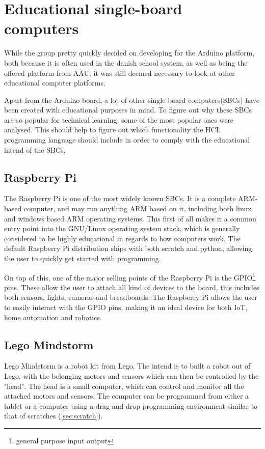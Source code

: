 \section{Educational single-board computers}
While the group pretty quickly decided on developing for the Arduino platform, both because it is often used in the danish school system, as well as being the offered platform from AAU, it was still deemed necessary to look at other educational computer platforms. 

Apart from the Arduino board, a lot of other single-board computers(SBCs) have been created with educational purposes in mind.
To figure out why these SBCs are so popular for technical learning, some of the most popular ones were analysed.
This should help to figure out which functionality the HCL programming language should include in order to comply with the educational intend of the SBCs.\cite{SBC}

\subsection{Raspberry Pi}
The Raspberry Pi is one of the most widely known SBCs. 
It is a complete ARM-based computer, and may run anything ARM based on it, including both linux and windows based ARM operating systems. 
This first of all makes it a common entry point into the GNU/Linux operating system stack, which is generally considered to be highly educational in regards to how computers work.
The default Raspberry Pi distribution ships with both scratch and python, allowing the user to quickly get started with programming.\cite{RaspberryPi}

On top of this, one of the major selling points of the Raspberry Pi is the GPIO\footnote{general purpose input output} pins. 
These allow the user to attach all kind of devices to the board, this includes both sensors, lights, cameras and breadboards. 
The Raspberry Pi allows the user to easily interact with the GPIO pins, making it an ideal device for both IoT, home automation and robotics.\cite{RaspberryPi}

\subsection{Lego Mindstorm}
Lego Mindstorm is a robot kit from Lego. 
The intend is to built a robot out of Lego, with the belonging motors and sensors which can then be controlled by the "head". 
The head is a small computer, which can control and monitor all the attached motors and sensors. 
The computer can be programmed from either a tablet or a computer using a drag and drop programming environment similar to that of scratches (\ref{sec:scratch}). 
\cite{LegoMindstorms}

